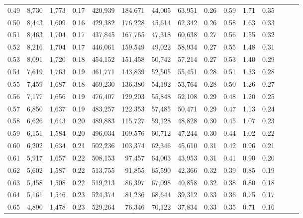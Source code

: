 \begin{tabular}{rrrrrrrrrrrrrrr}
0.49 &   8,730 &  1,773 &  0.17 &  420,939 &  184,671 &   44,005 &   63,951 &  0.26 &  0.59 &  1.71 &      0.35 \\
0.50 &   8,443 &  1,609 &  0.16 &  429,382 &  176,228 &   45,614 &   62,342 &  0.26 &  0.58 &  1.63 &      0.33 \\
0.51 &   8,463 &  1,704 &  0.17 &  437,845 &  167,765 &   47,318 &   60,638 &  0.27 &  0.56 &  1.55 &      0.32 \\
0.52 &   8,216 &  1,704 &  0.17 &  446,061 &  159,549 &   49,022 &   58,934 &  0.27 &  0.55 &  1.48 &      0.31 \\
0.53 &   8,091 &  1,720 &  0.18 &  454,152 &  151,458 &   50,742 &   57,214 &  0.27 &  0.53 &  1.40 &      0.29 \\
0.54 &   7,619 &  1,763 &  0.19 &  461,771 &  143,839 &   52,505 &   55,451 &  0.28 &  0.51 &  1.33 &      0.28 \\
0.55 &   7,459 &  1,687 &  0.18 &  469,230 &  136,380 &   54,192 &   53,764 &  0.28 &  0.50 &  1.26 &      0.27 \\
0.56 &   7,177 &  1,656 &  0.19 &  476,407 &  129,203 &   55,848 &   52,108 &  0.29 &  0.48 &  1.20 &      0.25 \\
0.57 &   6,850 &  1,637 &  0.19 &  483,257 &  122,353 &   57,485 &   50,471 &  0.29 &  0.47 &  1.13 &      0.24 \\
0.58 &   6,626 &  1,643 &  0.20 &  489,883 &  115,727 &   59,128 &   48,828 &  0.30 &  0.45 &  1.07 &      0.23 \\
0.59 &   6,151 &  1,584 &  0.20 &  496,034 &  109,576 &   60,712 &   47,244 &  0.30 &  0.44 &  1.02 &      0.22 \\
0.60 &   6,202 &  1,634 &  0.21 &  502,236 &  103,374 &   62,346 &   45,610 &  0.31 &  0.42 &  0.96 &      0.21 \\
0.61 &   5,917 &  1,657 &  0.22 &  508,153 &   97,457 &   64,003 &   43,953 &  0.31 &  0.41 &  0.90 &      0.20 \\
0.62 &   5,602 &  1,587 &  0.22 &  513,755 &   91,855 &   65,590 &   42,366 &  0.32 &  0.39 &  0.85 &      0.19 \\
0.63 &   5,458 &  1,508 &  0.22 &  519,213 &   86,397 &   67,098 &   40,858 &  0.32 &  0.38 &  0.80 &      0.18 \\
0.64 &   5,161 &  1,546 &  0.23 &  524,374 &   81,236 &   68,644 &   39,312 &  0.33 &  0.36 &  0.75 &      0.17 \\
0.65 &   4,890 &  1,478 &  0.23 &  529,264 &   76,346 &   70,122 &   37,834 &  0.33 &  0.35 &  0.71 &      0.16 \\

\end{tabular}
